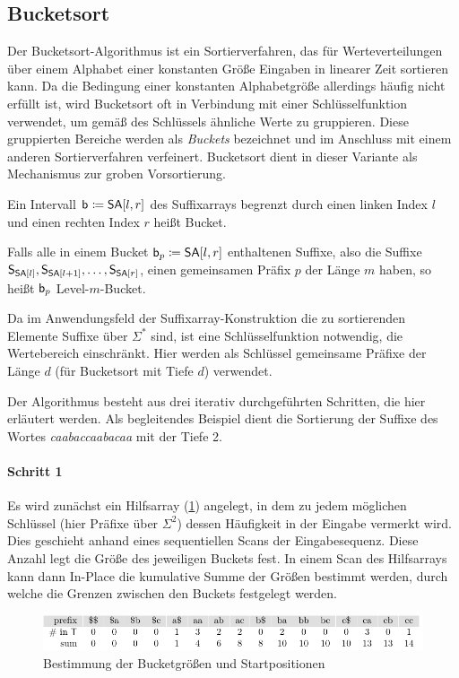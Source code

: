 \subsection{Bucketsort}
\label{section:bucketsort}

Der  Bucketsort-Algorithmus \cite[Kapitel 8.2 (dort unter dem Namen \emph{counting sort})]{Cormen2009} ist ein Sortierverfahren, das für Werteverteilungen über einem Alphabet einer konstanten Größe Eingaben in linearer Zeit sortieren kann. Da die Bedingung einer konstanten Alphabetgröße allerdings häufig nicht erfüllt ist, wird Bucketsort oft in Verbindung mit einer Schlüsselfunktion verwendet, um gemäß des Schlüssels \glqq ähnliche\grqq{} Werte zu gruppieren. Diese gruppierten Bereiche werden als \emph{Buckets} bezeichnet und im Anschluss mit einem anderen Sortierverfahren verfeinert. Bucketsort dient in dieser Variante als Mechanismus zur groben Vorsortierung.\par
\begin{definition}[Bucket]
	\label{def:bucket}
	Ein Intervall \(\bucket{} \coloneqq \sa[l, r]\) des Suffixarrays begrenzt durch einen linken Index \(l\) und einen rechten Index \(r\) heißt Bucket.\par
    Falls alle in einem Bucket \(\bucket{p} \coloneqq \sa[l, r]\) enthaltenen Suffixe, also die Suffixe \(\suffix{\sa[l]}, \suffix{\sa[l+1]}, \ldots, \suffix{\sa[r]}\), einen gemeinsamen Präfix \(p\) der Länge \(m\) haben, so heißt \(\mathsf{b}_{p}\) Level-\(m\)-Bucket.
\end{definition}
Da im Anwendungsfeld der Suffixarray-Konstruktion die zu sortierenden Elemente Suffixe über \(\Sigma^\ast\) sind, ist eine Schlüsselfunktion notwendig, die Wertebereich einschränkt. Hier werden als Schlüssel gemeinsame Präfixe der Länge \(d\) (für Bucketsort mit Tiefe \(d\)) verwendet.\par
Der Algorithmus besteht aus drei iterativ durchgeführten Schritten, die hier erläutert werden. Als begleitendes Beispiel dient die Sortierung der Suffixe des Wortes \emph{caabaccaabacaa} mit der Tiefe 2.
\paragraph{Schritt 1}
Es wird zunächst ein Hilfsarray (\cref{bucketsort:bkt}) angelegt, in dem zu jedem möglichen Schlüssel (hier Präfixe über \(\Sigma^2\)) dessen Häufigkeit in der Eingabe vermerkt wird. Dies geschieht anhand eines sequentiellen Scans der Eingabesequenz. Diese Anzahl legt die Größe des jeweiligen Buckets fest. In einem Scan des Hilfsarrays kann dann In-Place die kumulative Summe der Größen bestimmt werden, durch welche die Grenzen zwischen den Buckets festgelegt werden.
\begin{figure}[ht]
    \includegraphics[width=\textwidth]{kapitel/4_komponenten/sortieralgorithmen/bucketsort/step_01/bkt/image.pdf}
    \caption{Bestimmung der Bucketgrößen und Startpositionen}
    \label{bucketsort:bkt}
\end{figure}

